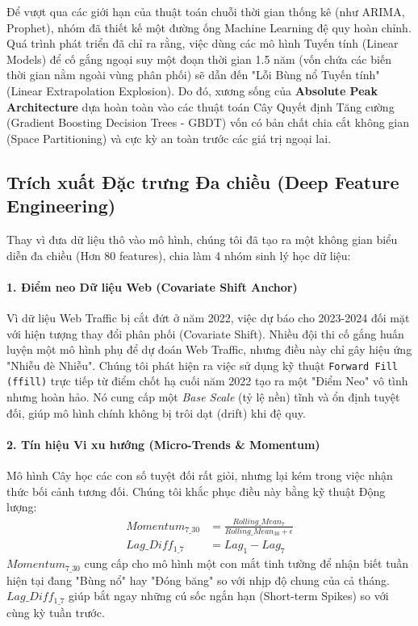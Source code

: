 \documentclass{article}
\begin{document}
Để vượt qua các giới hạn của thuật toán chuỗi thời gian thống kê (như ARIMA, Prophet), nhóm đã thiết kế một đường ống Machine Learning đệ quy hoàn chỉnh. Quá trình phát triển đã chỉ ra rằng, việc dùng các mô hình Tuyến tính (Linear Models) để cố gắng ngoại suy một đoạn thời gian 1.5 năm (vốn chứa các biến thời gian nằm ngoài vùng phân phối) sẽ dẫn đến "Lỗi Bùng nổ Tuyến tính" (Linear Extrapolation Explosion). Do đó, xương sống của \textbf{Absolute Peak Architecture} dựa hoàn toàn vào các thuật toán Cây Quyết định Tăng cường (Gradient Boosting Decision Trees - GBDT) vốn có bản chất chia cắt không gian (Space Partitioning) và cực kỳ an toàn trước các giá trị ngoại lai.

\subsection{Trích xuất Đặc trưng Đa chiều (Deep Feature Engineering)}

Thay vì đưa dữ liệu thô vào mô hình, chúng tôi đã tạo ra một không gian biểu diễn đa chiều (Hơn 80 features), chia làm 4 nhóm sinh lý học dữ liệu:

\paragraph{1. Điểm neo Dữ liệu Web (Covariate Shift Anchor)}
Vì dữ liệu Web Traffic bị cắt đứt ở năm 2022, việc dự báo cho 2023-2024 đối mặt với hiện tượng thay đổi phân phối (Covariate Shift). Nhiều đội thi cố gắng huấn luyện một mô hình phụ để dự đoán Web Traffic, nhưng điều này chỉ gây hiệu ứng "Nhiễu đè Nhiễu". Chúng tôi phát hiện ra việc sử dụng kỹ thuật \texttt{Forward Fill (ffill)} trực tiếp từ điểm chốt hạ cuối năm 2022 tạo ra một "Điểm Neo" vô tình nhưng hoàn hảo. Nó cung cấp một \textit{Base Scale} (tỷ lệ nền) tĩnh và ổn định tuyệt đối, giúp mô hình chính không bị trôi dạt (drift) khi đệ quy.

\paragraph{2. Tín hiệu Vi xu hướng (Micro-Trends \& Momentum)}
Mô hình Cây học các con số tuyệt đối rất giỏi, nhưng lại kém trong việc nhận thức bối cảnh tương đối. Chúng tôi khắc phục điều này bằng kỹ thuật Động lượng:
\begin{align}
    Momentum_{7\_30} &= \frac{Rolling\_Mean_7}{Rolling\_Mean_{30} + \epsilon} \\
    Lag\_Diff_{1\_7} &= Lag_1 - Lag_7
\end{align}
$Momentum_{7\_30}$ cung cấp cho mô hình một con mắt tinh tường để nhận biết tuần hiện tại đang "Bùng nổ" hay "Đóng băng" so với nhịp độ chung của cả tháng. $Lag\_Diff_{1\_7}$ giúp bắt ngay những cú sốc ngắn hạn (Short-term Spikes) so với cùng kỳ tuần trước.
\end{document}

